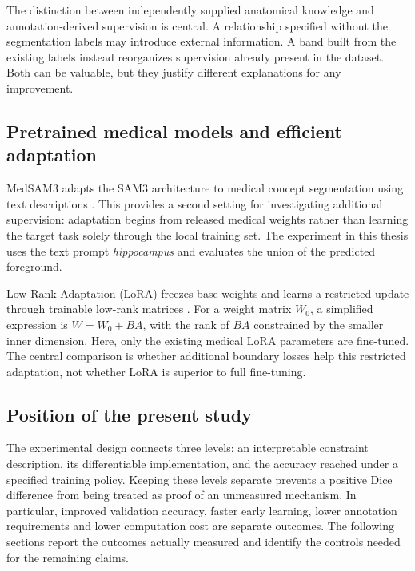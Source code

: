 The distinction between independently supplied anatomical knowledge and annotation-derived supervision is central. A relationship specified without the segmentation labels may introduce external information. A band built from the existing labels instead reorganizes supervision already present in the dataset. Both can be valuable, but they justify different explanations for any improvement.

\subsection{Pretrained medical models and efficient adaptation}
MedSAM3 adapts the SAM3 architecture to medical concept segmentation using text descriptions \cite{liu2025medsam3}. This provides a second setting for investigating additional supervision: adaptation begins from released medical weights rather than learning the target task solely through the local training set. The experiment in this thesis uses the text prompt \emph{hippocampus} and evaluates the union of the predicted foreground.

Low-Rank Adaptation (LoRA) freezes base weights and learns a restricted update through trainable low-rank matrices \cite{hu2021lora}. For a weight matrix $W_0$, a simplified expression is $W=W_0+BA$, with the rank of $BA$ constrained by the smaller inner dimension. Here, only the existing medical LoRA parameters are fine-tuned. The central comparison is whether additional boundary losses help this restricted adaptation, not whether LoRA is superior to full fine-tuning.

\subsection{Position of the present study}
The experimental design connects three levels: an interpretable constraint description, its differentiable implementation, and the accuracy reached under a specified training policy. Keeping these levels separate prevents a positive Dice difference from being treated as proof of an unmeasured mechanism. In particular, improved validation accuracy, faster early learning, lower annotation requirements and lower computation cost are separate outcomes. The following sections report the outcomes actually measured and identify the controls needed for the remaining claims.
